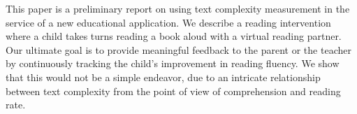 This paper is a preliminary report on using text complexity measurement in the service of a new educational application. We describe a reading intervention where a child takes turns reading a book aloud with a virtual reading partner. Our ultimate goal is to provide meaningful feedback to the parent or the teacher by continuously tracking the child's improvement in reading fluency. We show that this would not be a simple endeavor, due to an intricate relationship between text complexity from the point of view of comprehension and reading rate.
